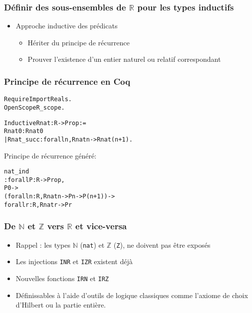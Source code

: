 \documentclass[compress]{beamer}
\begin{document}
\begin{frame}
\frametitle{D\'efinir des sous-ensembles de \(\mathbb R\) pour les types inductifs}
\begin{itemize}
\item Approche inductive des pr\'edicats
\begin{itemize}
\item H\'eriter du principe de r\'ecurrence
\item Prouver l'existence d'un entier naturel ou relatif correspondant


\end{itemize}
\end{itemize}
\end{frame}
\begin{frame}[fragile]
\frametitle{Principe de r\'ecurrence en Coq}
\begin{alltt}
Require Import Reals.
Open Scope R_scope.

Inductive Rnat : R -> Prop :=
  Rnat0 : Rnat 0
| Rnat_succ : forall n, Rnat n -> Rnat (n + 1).
\end{alltt}
Principe de r\'ecurrence g\'en\'er\'e:
\begin{alltt}
nat_ind
     : forall P : R -> Prop,
       P 0 ->
       (forall n : R, Rnat n -> P n -> P (n + 1)) ->
       forall r : R, Rnat r -> P r 
\end{alltt}%
\end{frame}
\begin{frame}
\frametitle{De \(\mathbb N\) et \(\mathbb Z\) vers \(\mathbb R\) et vice-versa}
\begin{itemize}
\item Rappel : les types \(\mathbb N\) ({\tt nat}) et \(\mathbb Z\) ({\tt Z}),
ne doivent pas \^etre expos\'es
\item Les injections {\tt INR} et {\tt IZR} existent d\'ej\`a
\item Nouvelles fonctions {\tt IRN} et {\tt IRZ}
\item D\'efinissables \`a l'aide d'outils de logique classiques comme l'axiome de choix d'Hilbert ou la partie enti\`ere.

\end{itemize}
\end{frame}
\end{document}
